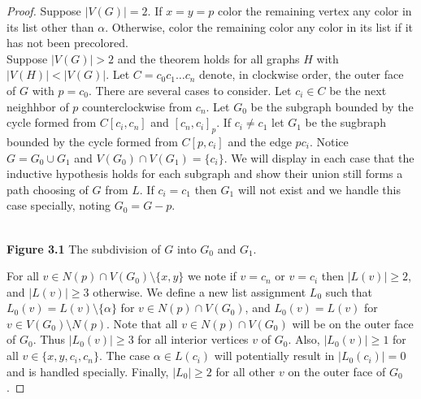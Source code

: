 \documentclass[11pt,letter]{article}
\begin{document}
\begin{proof}
Suppose $|V(G)|=2$. If $x=y=p$ color the remaining vertex any color in its list other than $\alpha$. Otherwise,
color the remaining color any color in its list if it has not been precolored.\\

\noindent Suppose $|V(G)|>2$ and the theorem holds for all graphs $H$ with $|V(H)|<|V(G)|$. Let
$C=c_0c_1\ldots c_n$ denote, in clockwise order, the outer face of $G$ with $p=c_0$.
There are several cases to consider. Let $c_i\in C$ be the next neighhbor of $p$ counterclockwise from $c_n$.
Let $G_0$ be the subgraph bounded by the cycle formed from $C[c_i,c_n]$ and $[c_n,c_i]_p$. If $c_i\ne c_1$ let
$G_1$ be the sugbraph bounded by the cycle formed from $C[p,c_i]$ and the edge $pc_i$. Notice $G=G_0\cup G_1$
and $V(G_0)\cap V(G_1)=\{c_i\}$.
We will display in each case that the inductive hypothesis holds for each subgraph and show their union still
forms a path choosing of $G$ from $L$.
If $c_i=c_1$ then $G_1$ will not exist and we handle this case specially, noting $G_0=G-p$.

\begin{center}
\hfill\\
\footnotesize{\textbf{Figure 3.1} The subdivision of $G$ into $G_0$ and $G_1$.}
\end{center}

\noindent For all $v\in N(p)\cap V(G_0)\setminus\{x,y\}$ we note if $v=c_n$ or $v=c_i$
then $|L(v)|\ge 2$, and $|L(v)|\ge3$ otherwise. We define a new list assignment $L_0$
such that $L_0(v)=L(v)\setminus\{\alpha\}$ for
$v\in N(p)\cap V(G_0)$, and $L_0(v)=L(v)$ for $v\in V(G_0)\setminus N(p)$. Note that all
$v\in N(p)\cap V(G_0)$ will be on the outer face of $G_0$. Thus $|L_0(v)|\ge 3$ for all interior
vertices $v$ of $G_0$. Also, $|L_0(v)|\ge 1$ for all $v\in\{x,y,c_i,c_n\}$. The case $\alpha\in L(c_i)$
will potentially result in $|L_0(c_i)|=0$ and is handled specially. Finally, $|L_0|\ge2$ for all other $v$ on
the outer face of $G_0$.


\end{proof}
\end{document}
